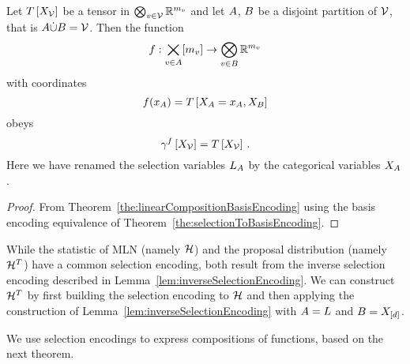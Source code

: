 \begin{lemma}\label{lem:inverseSelectionEncoding} %
	Let $T\left[X_{\mathcal{V}}\right]$ be a tensor in $\bigotimes_{v\in\mathcal{V}}\mathbb{R}^{m_{v}}$ and let $A$, $B$ be a disjoint partition of $\mathcal{V}$, that is $A\dot{\cup}B=\mathcal{V}$.
	Then the function
		\[ f : \bigtimes_{v\in A}[m_{v}] \rightarrow \bigotimes_{v\in B} \mathbb{R}^{m_{v}}  \]
	with coordinates
		\[ f(x_{A}) = T\left[X_{A}=x_{A},X_{B}\right]  \]
	obeys
		\[ \gamma^{f}\left[X_{\mathcal{V}}\right] = T\left[X_{\mathcal{V}}\right] \, . \]
	Here we have renamed the selection variables $L_{A}$ by the categorical variables $X_{A}$. 
\end{lemma}
\begin{proof}
	From Theorem~\ref{the:linearCompositionBasisEncoding} using the basis encoding equivalence of Theorem~\ref{the:selectionToBasisEncoding}.
\end{proof}


\begin{example}
	While the statistic of MLN (namely $\mathcal{H}$) and the proposal distribution (namely $\mathcal{H}^T$) have a common selection encoding, both result from the inverse selection encoding described in Lemma~\ref{lem:inverseSelectionEncoding}.
	We can construct $\mathcal{H}^T$ by first building the selection encoding to $\mathcal{H}$ and then applying the construction of Lemma~\ref{lem:inverseSelectionEncoding} with $A=L$ and $B=X_{[d]}$.
\end{example}


We use selection encodings to express compositions of functions, based on the next theorem.

